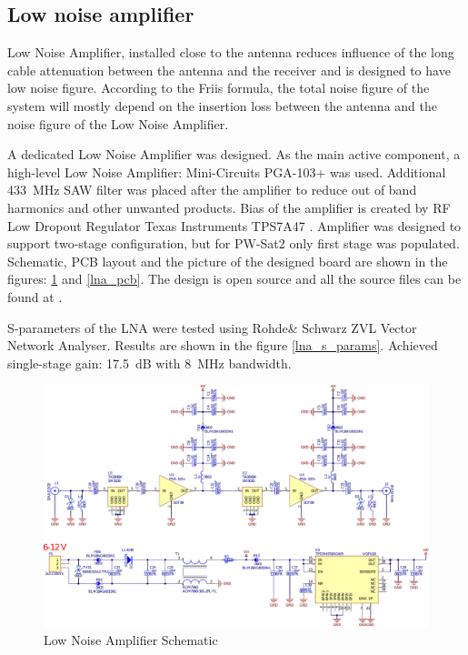 \subsection{Low noise amplifier}
Low Noise Amplifier, installed close to the antenna reduces influence of the long cable attenuation between the antenna and the receiver and is designed to have low noise figure. According to the Friis formula, the total noise figure of the system will mostly depend on the insertion loss between the antenna and the noise figure of the Low Noise Amplifier. 

A dedicated Low Noise Amplifier was designed. As the main active component, a high-level Low Noise Amplifier: Mini-Circuits PGA-103+ \cite{lna_pga_datasheet} was used. Additional \SI{433}{\MHz} SAW filter was placed after the amplifier to reduce out of band harmonics and other unwanted products. Bias of the amplifier is created by RF Low Dropout Regulator Texas Instruments TPS7A47 \cite{lna_ldo_datasheet}. Amplifier was designed to support two-stage configuration, but for PW-Sat2 only first stage was populated. Schematic, PCB layout and the picture of the designed board are shown in the figures: \ref{lna_schematic} and \ref{lna_pcb}. The design is open source and all the source files can be found at \cite{lna_github}.

S-parameters of the LNA were tested using Rohde\& Schwarz ZVL Vector Network Analyser. Results are shown in the figure \ref{lna_s_params}. Achieved single-stage gain: \SI{17.5}{\dB} with \SI{8}{\MHz} bandwidth.

\begin{landscape}
\begin{figure}
    \centering
    \includegraphics[width=1.12\paperwidth]{img/7/lna_schematic.pdf}
    \caption{Low Noise Amplifier Schematic}
    \label{lna_schematic}
\end{figure}
\end{landscape}

